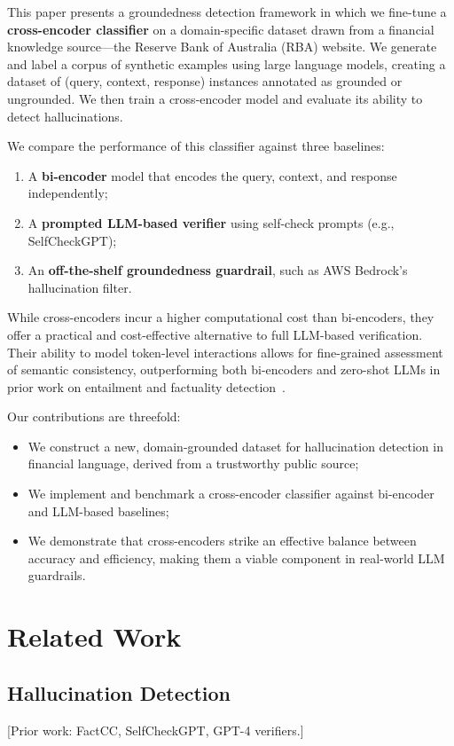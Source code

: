 \documentclass[11pt]{article}
\begin{document}
This paper presents a groundedness detection framework in which we fine-tune a \textbf{cross-encoder classifier} on a domain-specific dataset drawn from a financial knowledge source—the Reserve Bank of Australia (RBA) website. We generate and label a corpus of synthetic examples using large language models, creating a dataset of (query, context, response) instances annotated as grounded or ungrounded. We then train a cross-encoder model and evaluate its ability to detect hallucinations.

We compare the performance of this classifier against three baselines:
\begin{enumerate}
    \item A \textbf{bi-encoder} model that encodes the query, context, and response independently;
    \item A \textbf{prompted LLM-based verifier} using self-check prompts (e.g., SelfCheckGPT);
    \item An \textbf{off-the-shelf groundedness guardrail}, such as AWS Bedrock's hallucination filter.
\end{enumerate}

While cross-encoders incur a higher computational cost than bi-encoders, they offer a practical and cost-effective alternative to full LLM-based verification. Their ability to model token-level interactions allows for fine-grained assessment of semantic consistency, outperforming both bi-encoders and zero-shot LLMs in prior work on entailment and factuality detection~\cite{wang2018glue, reimers2019sentencebert}.

Our contributions are threefold:
\begin{itemize}
    \item We construct a new, domain-grounded dataset for hallucination detection in financial language, derived from a trustworthy public source;
    \item We implement and benchmark a cross-encoder classifier against bi-encoder and LLM-based baselines;
    \item We demonstrate that cross-encoders strike an effective balance between accuracy and efficiency, making them a viable component in real-world LLM guardrails.
\end{itemize}


\section{Related Work}
\subsection{Hallucination Detection}
[Prior work: FactCC, SelfCheckGPT, GPT-4 verifiers.]
\end{document}
